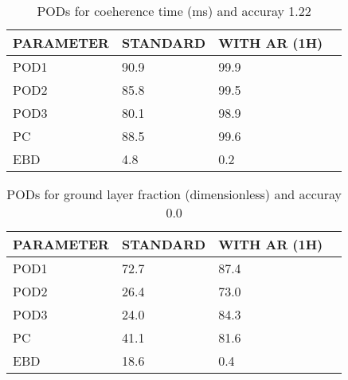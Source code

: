 \documentclass[11pt,english]{article}
\begin{document}
\begin{table}[]
\begin{center}
\begin{tabular}{|l|l|l|l|}
\hline
\multicolumn{1}{|c|}{\cellcolor[HTML]{C0C0C0}\textbf{PARAMETER}} & \multicolumn{1}{c|}{\cellcolor[HTML]{C0C0C0}\textbf{STANDARD}} & \multicolumn{1}{c|}{\cellcolor[HTML]{C0C0C0}\textbf{WITH AR (1H)}} \\
\hline
\cellcolor[HTML]{C0C0C0}POD1  & 90.9                                & 99.9         \\
\cellcolor[HTML]{C0C0C0}POD2  & 85.8                                & 99.5         \\
\cellcolor[HTML]{C0C0C0}POD3  & 80.1                                & 98.9         \\
\cellcolor[HTML]{C0C0C0}PC    & 88.5                                  & 99.6           \\
\cellcolor[HTML]{C0C0C0}EBD   & 4.8                                 & 0.2          \\
\hline
\end{tabular}
\caption{PODs for coeherence time (ms) and accuray 1.22}
\end{center}
\end{table}
\begin{table}[]
\begin{center}
\begin{tabular}{|l|l|l|l|}
\hline
\multicolumn{1}{|c|}{\cellcolor[HTML]{C0C0C0}\textbf{PARAMETER}} & \multicolumn{1}{c|}{\cellcolor[HTML]{C0C0C0}\textbf{STANDARD}} & \multicolumn{1}{c|}{\cellcolor[HTML]{C0C0C0}\textbf{WITH AR (1H)}} \\
\hline
\cellcolor[HTML]{C0C0C0}POD1  & 72.7                                & 87.4         \\
\cellcolor[HTML]{C0C0C0}POD2  & 26.4                                & 73.0         \\
\cellcolor[HTML]{C0C0C0}POD3  & 24.0                                & 84.3         \\
\cellcolor[HTML]{C0C0C0}PC    & 41.1                                  & 81.6           \\
\cellcolor[HTML]{C0C0C0}EBD   & 18.6                                 & 0.4          \\
\hline
\end{tabular}
\caption{PODs for ground layer fraction (dimensionless) and accuray 0.0}
\end{center}
\end{table}
\end{document}
